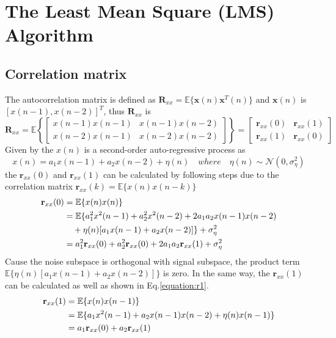 \allowdisplaybreaks[4]
\section{The Least Mean Square (LMS) Algorithm}
\subsection{Correlation matrix}
The autocorrelation matrix is defined \cite{Mandic2019} as $\mathbf{R}_{xx}=\mathbb{E}\{\mathbf{x}(n)\mathbf{x}^T(n)\}$ and $\mathbf{x}(n)$ is $[ x(n-1), x(n-2)]^T$, thus $\mathbf{R}_{xx}$ is
\begin{equation}
\mathbf{R}_{xx}=\mathbb{E}\left \{ \left[
	\begin{matrix}
	x(n-1)x(n-1) & x(n-1)x(n-2)\\
	x(n-2)x(n-1) & x(n-2)x(n-2)
	\end{matrix}
		\right]
\right \}=
\left[
	\begin{matrix}
	\mathbf{r}_{xx}(0) & \mathbf{r}_{xx}(1)\\
	\mathbf{r}_{xx}(1) & \mathbf{r}_{xx}(0)
	\end{matrix}
		\right]
\end{equation}
Given by the $x(n)$ is a second-order auto-regressive process as 
\begin{equation}
x(n)=a_1x(n-1)+a_2x(n-2)+\eta(n) \quad where \quad \eta(n)\sim \mathcal{N}(0,\sigma_{\eta}^2)
\end{equation}
the $\mathbf{r}_{xx}(0)$ and $\mathbf{r}_{xx}(1)$ can be calculated by following steps due to the correlation matrix $\mathbf{r}_{xx}(k)=\mathbb{E}\{x(n)x(n-k)\}$
\begin{align}
\mathbf{r}_{xx}(0)
	&=\mathbb{E}\{x(n)x(n)\} \notag \\
	&=\mathbb{E}\{ a_1^2x^2(n-1)+ a_2^2x^2(n-2)+2 a_1a_2 x(n-1) x(n-2)\notag\\
	&\quad+\eta(n)[a_1x(n-1)+a_2x(n-2)]\}+\sigma^2_\eta \notag\\
	&=a_1^2\mathbf{r}_{xx}(0)+a_2^2\mathbf{r}_{xx}(0)+2a_1a_2\mathbf{r}_{xx}(1)+\sigma^2_\eta	\label{equation:r0}
\end{align}
Cause the noise subspace is orthogonal with signal subspace, the product term $\mathbb{E}\{\eta(n)[a_1x(n-1)+a_2x(n-2)]\}$ is zero. In the same way, the $\mathbf{r}_{xx}(1)$ can be calculated as well as shown in Eq.\ref{equation:r1}.
\begin{align}
\mathbf{r}_{xx}(1)
	&=\mathbb{E}\{x(n)x(n-1)\} \notag \\
	&=\mathbb{E}\{ a_1x^2(n-1)+ a_2x(n-1)x(n-2)+\eta(n)x(n-1)\}\notag\\
	&=a_1\mathbf{r}_{xx}(0)+a_2\mathbf{r}_{xx}(1)	\label{equation:r1}
\end{align}
